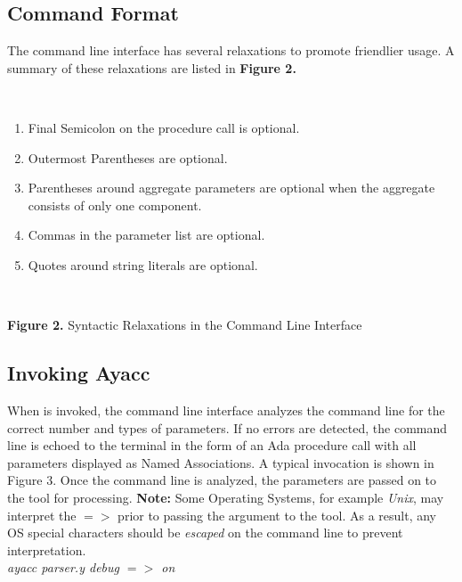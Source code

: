 \subsection{Command Format}
The command line interface has several relaxations to promote friendlier
usage.  A summary of these relaxations are listed in {\bf Figure 2.}

\noindent\hspace{-0.05in}\hrulefill\hspace{0.0in}\\
\vspace{-0.2in}
\begin{enumerate}
\item Final Semicolon on the procedure call is optional.
\item Outermost Parentheses are optional.
\item Parentheses around aggregate parameters are optional when the aggregate
consists of only one component.
\item Commas in the parameter list are optional.
\item Quotes around string literals are optional.
\end{enumerate}
\hspace{-0.05in}\hrulefill\hspace{0.0in}\\
\centerline{{\bf Figure 2.} Syntactic Relaxations in the Command Line Interface}
\subsection{Invoking Ayacc}
When \ayacc is invoked, the command line interface analyzes the
command line for the correct number and types of parameters.  If no errors
are detected, the command line is echoed to the terminal in the form of
an Ada procedure call with all parameters displayed as Named Associations.
A typical invocation is shown in Figure 3.
Once the command line is analyzed,
the parameters are passed on to the tool for processing.  {\bf Note:} Some
Operating Systems, for example {\it Unix}, may
interpret the {\bf $=>$} prior to passing the argument to the tool.  As a
result, any OS special characters should be {\it escaped} on the command
line to prevent interpretation.
\newpage
\noindent\hspace{-0.05in}\hrulefill\hspace{0.0in}\\
\vspace{-0.2in}
{\it ayacc  parser.y debug $=>$ \footnotemark on}\\


